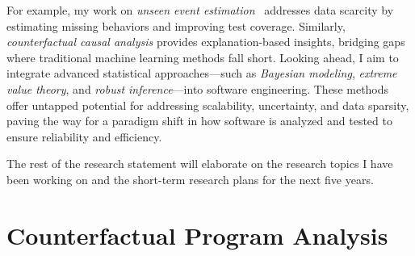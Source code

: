 \documentclass{article}
\begin{document}
For example, my work on \emph{unseen event estimation}~\cite{leeStatisticalReachabilityAnalysis2023,leeHowMuchUnseen2024,leeStructureawareResidualRisk2025,leeAccountingMissingEvents2025,liyanageExtrapolatingCoverageRate2024} addresses data scarcity by estimating missing behaviors and improving test coverage. Similarly, \emph{counterfactual causal analysis}\cite{leeObservationbasedApproximateDependency2021,leeCausalProgramDependence2025a,leeEvaluatingLexicalApproximation2020,ohEffectivelySamplingHigher2021} provides explanation-based insights, bridging gaps where traditional machine learning methods fall short.
% 
Looking ahead, I aim to integrate advanced statistical approaches—such as \emph{Bayesian modeling}, \emph{extreme value theory}, and \emph{robust inference}—into software engineering. These methods offer untapped potential for addressing scalability, uncertainty, and data sparsity, paving the way for a paradigm shift in how software is analyzed and tested to ensure reliability and efficiency.

\vspace{0.5em}

The rest of the research statement will elaborate on the research topics I have been working on and the short-term research plans for the next five years.


\newpage

\section{Counterfactual Program Analysis}
\label{sec:dependency}

\end{document}
